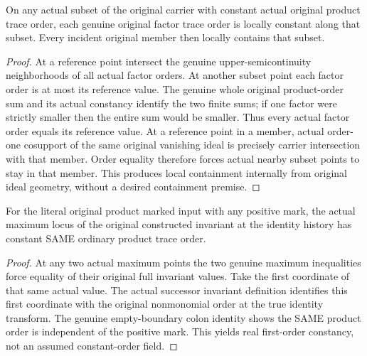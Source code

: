 \begin{lemma}
\label{hir:sharp-original-factor-usc-product-sum-local-rigidity}
\leanok
On any actual subset of the original carrier with constant actual original product trace order, each genuine original factor trace order is locally constant along that subset. Every incident original member then locally contains that subset.
\end{lemma}
\begin{proof}
At a reference point intersect the genuine upper-semicontinuity neighborhoods of all actual factor orders. At another subset point each factor order is at most its reference value. The genuine whole original product-order sum and its actual constancy identify the two finite sums; if one factor were strictly smaller then the entire sum would be smaller. Thus every actual factor order equals its reference value. At a reference point in a member, actual order-one cosupport of the same original vanishing ideal is precisely carrier intersection with that member. Order equality therefore forces actual nearby subset points to stay in that member. This produces local containment internally from original ideal geometry, without a desired containment premise.
\end{proof}

\begin{lemma}
\label{hir:sharp-actual-product-maximum-centre-first-order-constant}
\leanok
For the literal original product marked input with any positive mark, the actual maximum locus of the original constructed invariant at the identity history has constant SAME ordinary product trace order.
\end{lemma}
\begin{proof}
At any two actual maximum points the two genuine maximum inequalities force equality of their original full invariant values. Take the first coordinate of that same actual value. The actual successor invariant definition identifies this first coordinate with the original nonmonomial order at the true identity transform. The genuine empty-boundary colon identity shows the SAME product order is independent of the positive mark. This yields real first-order constancy, not an assumed constant-order field.
\end{proof}

